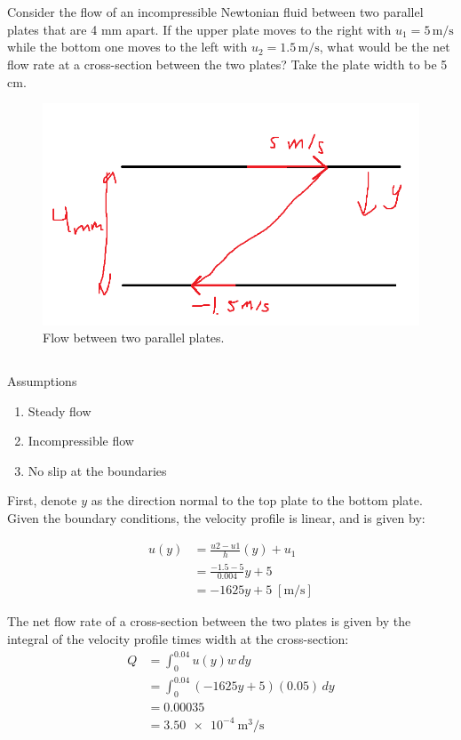 \section{}
Consider the flow of an incompressible Newtonian fluid between two parallel plates that are 4 mm apart. 
If the upper plate moves to the right with \(u_1 = 5 \, \text{m/s}\) while the bottom one moves to the left with 
\(u_2 = 1.5 \, \text{m/s}\), what would be the net flow rate at a cross-section between the two plates? Take the plate 
width to be 5 cm.

\begin{figure}[h]
    \centering
    \includegraphics[width=0.5\linewidth]{Questions/Figures/Q3ProblemDiagram.png}
    \caption{Flow between two parallel plates.}
    \label{fig:Q3}
\end{figure}

\subsection{}
Assumptions
\begin{enumerate}
    \item Steady flow
    \item Incompressible flow
    \item No slip at the boundaries
\end{enumerate}

First, denote $y$ as the direction normal to the top plate to the bottom plate. Given the boundary conditions, the velocity
profile is linear, and is given by:

\[
\begin{aligned}
    u(y) &= \frac{u2 - u1}{h}(y) + u_1 \nonumber \\
    &= \frac{-1.5 - 5}{0.004}y + 5 \nonumber \\
    &= -1625y + 5 \nonumber \;[\unit{\meter\per\second}]
\end{aligned}
\]

The net flow rate of a cross-section between the two plates is given by the integral of the velocity profile times width at 
the cross-section:
\[
    \begin{aligned}
        Q &= \int_{0}^{0.04} u(y)w \, dy \nonumber \\
        &= \int_{0}^{0.04} (-1625y + 5)(0.05) \, dy \nonumber \\
        &= 0.00035 \\
        &= \boxed{\qty{3.50e-4}{\meter\cubed\per\second}}
    \end{aligned}                       
\]


